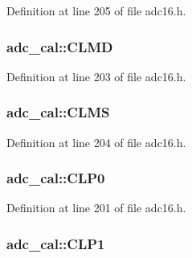 Definition at line 205 of file adc16.\+h.

\subsubsection[{\texorpdfstring{C\+L\+MD}{CLMD}}]{ adc\+\_\+cal\+::\+C\+L\+MD}\hypertarget{structadc__cal_af86916e18c3910ed96c655de9f7fc7bd}{}\label{structadc__cal_af86916e18c3910ed96c655de9f7fc7bd}


Definition at line 203 of file adc16.\+h.

\subsubsection[{\texorpdfstring{C\+L\+MS}{CLMS}}]{ adc\+\_\+cal\+::\+C\+L\+MS}\hypertarget{structadc__cal_aa14e6348c8e56b4f43b23f99db7095de}{}\label{structadc__cal_aa14e6348c8e56b4f43b23f99db7095de}


Definition at line 204 of file adc16.\+h.

\subsubsection[{\texorpdfstring{C\+L\+P0}{CLP0}}]{ adc\+\_\+cal\+::\+C\+L\+P0}\hypertarget{structadc__cal_a9087aa74023e0b4b1513a993739e12ac}{}\label{structadc__cal_a9087aa74023e0b4b1513a993739e12ac}


Definition at line 201 of file adc16.\+h.

\subsubsection[{\texorpdfstring{C\+L\+P1}{CLP1}}]{ adc\+\_\+cal\+::\+C\+L\+P1}\hypertarget{structadc__cal_ad52a0308d0dc3f19d0523ef68c7c6b8a}{}\label{structadc__cal_ad52a0308d0dc3f19d0523ef68c7c6b8a}


